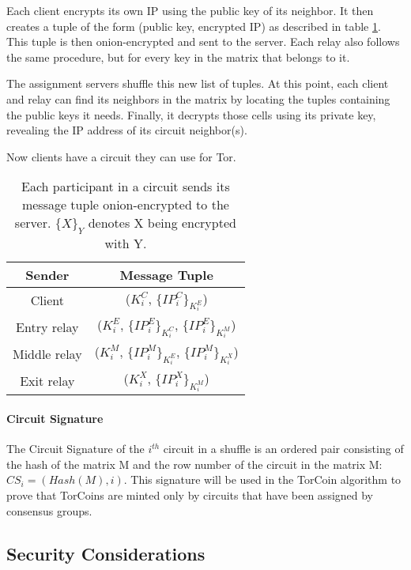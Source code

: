 Each client encrypts its own IP using the public key of its neighbor. It then
creates a tuple of the form (public key, encrypted IP) as described in table
\ref{table:message_format}. This tuple is then onion-encrypted and sent to the
server.  Each relay also follows the same procedure, but for every key in the
matrix that belongs to it.

The assignment servers shuffle this new list of tuples. At this point, each
client and relay can find its neighbors in the matrix by locating the tuples
containing the public keys it needs. Finally, it decrypts those cells using
its private key, revealing the IP address of its circuit neighbor(s).

Now clients have a circuit they can use for Tor.

{\renewcommand{\arraystretch}{2}
\begin{table}[h]
\centering
  \begin{tabular}{ |c || c| }
  \hline
  \textbf{Sender} & \textbf{Message Tuple} \\ \hline
  Client & ($K_{i}^{C}$, $\{IP_{i}^{C}\}_{K_{i}^{E}}$) \\ \hline
  Entry relay & ($K_{i}^{E}$, $\{IP_{i}^{E}\}_{K_{i}^{C}}$, $\{IP_{i}^{E}\}_{K_{i}^{M}}$) \\ \hline
  Middle relay & ($K_{i}^{M}$, $\{IP_{i}^{M}\}_{K_{i}^{E}}$, $\{IP_{i}^{M}\}_{K_{i}^{X}}$) \\ \hline
  Exit relay & ($K_{i}^{X}$, $\{IP_{i}^{X}\}_{K_{i}^{M}}$) \\ \hline
  \end{tabular}
  \caption{Each participant in a circuit sends its message 
  tuple onion-encrypted to the server. $\{X\}_{Y}$ denotes X being encrypted with Y.}
  \label{table:message_format}
\end{table}

\paragraph{Circuit Signature} The Circuit Signature of the $i^{th}$ circuit in
a shuffle is an ordered pair consisting of the hash of the matrix M and the
row number of the circuit in the matrix M: $CS_i = (Hash(M), i)$. This
signature will be used in the TorCoin algorithm to prove that TorCoins are
minted only by circuits that have been assigned by consensus groups.

\subsection{Security Considerations} 

}
